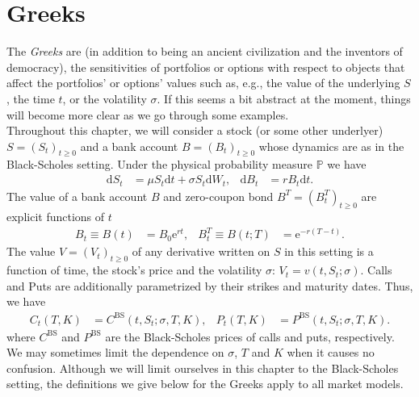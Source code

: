 \documentclass[12pt]{book}
\numberwithin{equation}{chapter}
\theoremstyle{plain}
\numberwithin{theorem}{section}
\theoremstyle{definition}
\numberwithin{exercise}{chapter}
\newcommand{\<}{\langle}
\renewcommand{\>}{\rangle}
\renewcommand{\(}{\left(}
\renewcommand{\)}{\right)}
\renewcommand{\[}{\left[}
\renewcommand{\]}{\right]}
\newcommand\Pb{\mathds{P}}
\newcommand\sig{\sigma}
\newcommand\dd{\mathrm{d}}
\newcommand\ee{\mathrm{e}}
\newcommand\BS{\textrm{BS}}
\theoremstyle{definition}
\numberwithin{question}{section}
\begin{document}



\chapter{Greeks}
The \textit{Greeks} are (in addition to being an ancient civilization and the inventors of democracy), the sensitivities of portfolios or options with respect to objects that affect the portfolios' or options' values such as, e.g., the value of the underlying $S$, the time $t$, or the volatility $\sig$.  If this seems a bit abstract at the moment, things will become more clear as we go through some examples.
\\[0.5em]
Throughout this chapter, we will consider a stock (or some other underlyer) $S = (S_t)_{t \geq 0}$ and a bank account $B = (B_t)_{t \geq 0}$ whose dynamics are as in the Black-Scholes setting.  Under the physical probability measure $\Pb$ we have
\begin{align}
\dd S_t
	&=	\mu S_t \dd t + \sig S_t \dd W_t , &
\dd B_t
	&=	r B_t \dd t .
\end{align}
The value of a bank account $B$ and zero-coupon bond $B^T = (B_t^T)_{t \geq 0}$ are explicit functions of $t$
\begin{align}
B_t \equiv B(t)
	&=	B_0 \ee^{r t} , &
B_t^T \equiv B(t;T)
	&=	\ee^{-r (T-t)} .
\end{align}
The value $V = (V_t)_{t \geq 0}$ of any derivative written on $S$ in this setting is a function of time, the stock's price and the volatility $\sig$: $V_t = v(t,S_t;\sig)$.  Calls and Puts are additionally parametrized by their strikes and maturity dates.  Thus, we have
\begin{align}
C_t(T,K)
	&=	C^\BS(t,S_t;\sig,T,K) , &
P_t(T,K)
	&=	P^\BS(t,S_t;\sig,T,K) .
\end{align}
where $C^\BS$ and $P^\BS$ are the Black-Scholes prices of calls and puts, respectively.  
We may sometimes limit the dependence on $\sig$, $T$ and $K$ when it causes no confusion.
Although we will limit ourselves in this chapter to the Black-Scholes setting, the definitions we give below for the Greeks apply to all market models.
\end{document}

